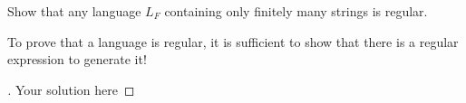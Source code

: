 \documentclass[12pt]{article}
\newenvironment{exercise}[2][Exercise]{\begin{trivlist}
\item[\hskip \labelsep {\bfseries #1}\hskip \labelsep {\bfseries #2.}]}{\end{trivlist}}
\newenvironment{solution}[1][{\color{red} Solution:}]{\begin{trivlist}
\item[\hskip \labelsep {\bfseries #1}\hskip \labelsep {\bfseries}]}{\end{trivlist}}
\begin{document}
\clearpage
\begin{exercise}{3}
Show that any language $L_F$ containing only finitely many strings is regular.
\end{exercise}

\begin{tip}
To prove that a language is regular, it is sufficient to show that there is a regular expression to generate it!
\end{tip}


\begin{solution}

\begin{proof}[\unskip\nopunct]
	Your solution here
\end{proof}

\end{solution}

\clearpage
\end{document}
